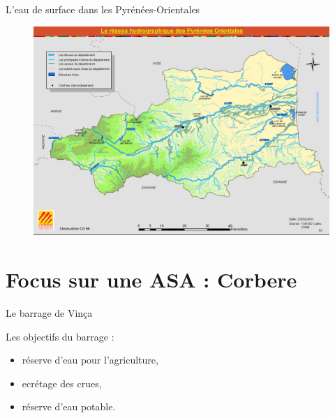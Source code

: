 \documentclass[newPxFont]{beamer}
\begin{document}

\begin{frame}[c]{L'eau de surface dans les Pyrénées-Orientales}
\vspace{-4em}
\begin{figure}
	\hspace*{-0.6cm}
	\includegraphics[width = 1.1\textwidth]{img/canaux_po}
\end{figure}


\end{frame}


\section{Focus sur une ASA : Corbere}


\begin{frame}[c]{Le barrage de Vinça }
\vspace{-0.5cm}

\startchronology[startyear=1900, stopyear=2000]
\stopchronology

\vspace{-1em}
Les objectifs du barrage :
\begin{itemize}
	\item réserve d'eau pour l'agriculture,
	\item ecrétage des crues,
	\item réserve d'eau potable.
\end{itemize}



\end{frame}
\end{document}
